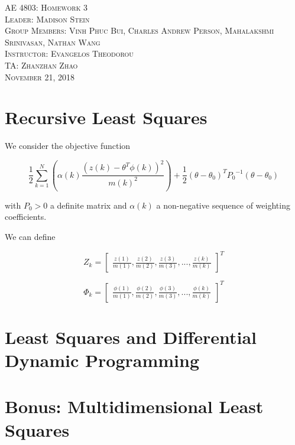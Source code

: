 \documentclass{article}
\begin{document}
\begin{titlepage}
    \center
    \textsc{\LARGE AE 4803: Homework 3}\\[1.5cm]
    \textsc{\Large Leader: Madison Stein}\\[0.5cm]
    \textsc{\Large Group Members: Vinh Phuc Bui, Charles Andrew Person, Mahalakshmi Srinivasan, Nathan Wang}\\[2cm]
    \textsc{\large Instructor: Evangelos Theodorou}\\[0.5cm]
    \textsc{\large TA: Zhanzhan Zhao}\\[1cm]
    \textsc{\large November 21, 2018}
\end{titlepage}

\section{Recursive Least Squares}

We consider the objective function

\begin{equation}
\frac{1}{2} \sum\limits_{k=1}^N (\alpha(k) \frac{(z(k) - \theta^T \phi(k))^2}{m(k)^2}) + \frac{1}{2} (\theta - \theta_0)^T {P_0}^{-1} (\theta - \theta_0)
\end{equation}

with $P_0 > 0$ a definite matrix and $\alpha(k)$ a non-negative sequence of weighting coefficients.

We can define

\[
Z_k =
\begin{bmatrix}
\frac{z(1)}{m(1)},\frac{z(2)}{m(2)},\frac{z(3)}{m(3)},...,\frac{z(k)}{m(k)}
\end{bmatrix}^T
\]

\[
\Phi_k =
\begin{bmatrix}
\frac{\phi(1)}{m(1)},\frac{\phi(2)}{m(2)},\frac{\phi(3)}{m(3)},...,\frac{\phi(k)}{m(k)}
\end{bmatrix}^T
\]

\section{Least Squares and Differential Dynamic Programming}

\section{Bonus: Multidimensional Least Squares}
\end{document}
